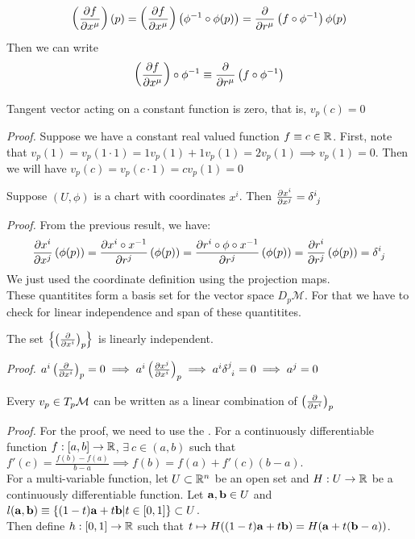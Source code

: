 $$\left( \pdv{f}{x^\mu} \right) \left( p \right) = \left( \pdv{f}{x^\mu} \right)\left( \phi^{-1}\circ \phi(p) \right) = \pdv{r^\mu}\left( f\circ \phi^{-1} \right){\phi(p)}$$
Then we can write 
$$\left( \pdv{f}{x^\mu} \right)\circ \phi^{-1} \equiv   \pdv{r^\mu}\left( f\circ \phi^{-1} \right)$$
\begin{ffact}
  Tangent vector acting on a constant function is zero, that is, $v_p(c) = 0$
\end{ffact}
\textit{Proof. } Suppose we have a constant real valued function $f\equiv c\in \mathbb{R}$. First, note that $v_p(1) = v_p(1\cdot 1) = 1v_p(1) + 1v_p(1) = 2v_p(1)\implies v_p(1)=0$. Then we will have $v_p(c) = v_p(c\cdot 1) = c v_p(1) = 0 $
\begin{proposition}
  Suppose $(U,\phi)$ is a chart with coordinates $x^i$. Then $\pdv{x^i}{x^j} = \tensor{\delta}{^i _j}$
\end{proposition}
\textit{Proof.} From the previous result, we have:
$$\pdv{x^i}{x^j}\brac{\phi(p)} = \pdv{x^i \circ x^{-1}}{r^j}\brac{\phi(p)} = \pdv{r^i\circ \phi \circ x^{-1}}{r^j}\brac{\phi(p)} =\pdv{r^i}{r^j}\brac{\phi(p)} = \tensor{\delta}{^i _j}$$
We just used the coordinate definition using the projection maps. \\[0.3cm]
These quantitites form a basis set for the vector space $D_p\mathcal{M}$. For that we have to check for linear independence and span of these quantitites. 
\begin{proposition}
 The set $\left\{\left( \pdv{x^i} \right)_p \right\}$ is linearly independent.
\end{proposition}
\textit{Proof.}  $a^i \brac{\pdv{x^i}}_p = 0\implies  a^i \brac{\pdv{x^j}{x^i}}_p \implies a^i\tensor{\delta}{^j _i} = 0 \implies a^j = 0$
\begin{proposition}
  Every $v_p\in T_p\mathcal M$ can be written as a linear combination of $\left( \pdv{x^i} \right)_p$
\end{proposition}
\textit{Proof.} For the proof, we need to use the . For a continuously differentiable function $f:[a,b]\rightarrow \mathbb{R}$, $\exists \ c\in(a,b)$ such that $f'(c) = \frac{f(b)-f(a)}{b-a}\implies f(b) = f(a)+ f'(c)(b-a)$.\\[0.2cm] For a multi-variable function, let $U\subset \mathbb{R}^n$ be an open set and $H:U\rightarrow \mathbb{R}$ be a continuously differentiable function. Let $\boldsymbol{\mathbf{a}},\boldsymbol{\mathbf{b}}\in U$ and $l(\boldsymbol{\mathbf{a}},\boldsymbol{\mathbf{b}})\equiv \{(1-t)\boldsymbol{\mathbf{a}}+t\boldsymbol{\mathbf{b}}|t\in [0,1]\}\subset U$.\\[0.2cm] Then define $h:[0,1]\rightarrow \mathbb{R}$ such that $t\mapsto H((1-t)\boldsymbol{\mathbf{a}}+t\boldsymbol{\mathbf{b}}) = H(\boldsymbol{\mathbf{a}}+t(\boldsymbol{\mathbf{b}}-a))$.\\[0.2cm]
